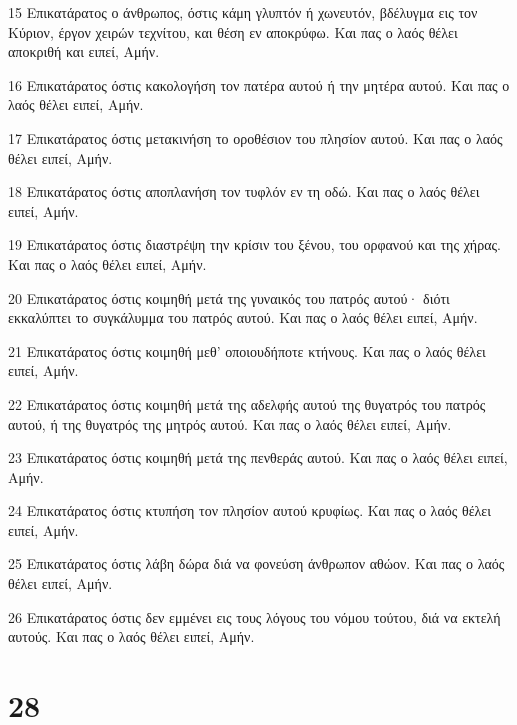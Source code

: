 \par 15 Επικατάρατος ο άνθρωπος, όστις κάμη γλυπτόν ή χωνευτόν, βδέλυγμα εις τον Κύριον, έργον χειρών τεχνίτου, και θέση εν αποκρύφω. Και πας ο λαός θέλει αποκριθή και ειπεί, Αμήν.
\par 16 Επικατάρατος όστις κακολογήση τον πατέρα αυτού ή την μητέρα αυτού. Και πας ο λαός θέλει ειπεί, Αμήν.
\par 17 Επικατάρατος όστις μετακινήση το οροθέσιον του πλησίον αυτού. Και πας ο λαός θέλει ειπεί, Αμήν.
\par 18 Επικατάρατος όστις αποπλανήση τον τυφλόν εν τη οδώ. Και πας ο λαός θέλει ειπεί, Αμήν.
\par 19 Επικατάρατος όστις διαστρέψη την κρίσιν του ξένου, του ορφανού και της χήρας. Και πας ο λαός θέλει ειπεί, Αμήν.
\par 20 Επικατάρατος όστις κοιμηθή μετά της γυναικός του πατρός αυτού· διότι εκκαλύπτει το συγκάλυμμα του πατρός αυτού. Και πας ο λαός θέλει ειπεί, Αμήν.
\par 21 Επικατάρατος όστις κοιμηθή μεθ' οποιουδήποτε κτήνους. Και πας ο λαός θέλει ειπεί, Αμήν.
\par 22 Επικατάρατος όστις κοιμηθή μετά της αδελφής αυτού της θυγατρός του πατρός αυτού, ή της θυγατρός της μητρός αυτού. Και πας ο λαός θέλει ειπεί, Αμήν.
\par 23 Επικατάρατος όστις κοιμηθή μετά της πενθεράς αυτού. Και πας ο λαός θέλει ειπεί, Αμήν.
\par 24 Επικατάρατος όστις κτυπήση τον πλησίον αυτού κρυφίως. Και πας ο λαός θέλει ειπεί, Αμήν.
\par 25 Επικατάρατος όστις λάβη δώρα διά να φονεύση άνθρωπον αθώον. Και πας ο λαός θέλει ειπεί, Αμήν.
\par 26 Επικατάρατος όστις δεν εμμένει εις τους λόγους του νόμου τούτου, διά να εκτελή αυτούς. Και πας ο λαός θέλει ειπεί, Αμήν.

\chapter{28}

